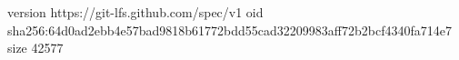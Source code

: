 version https://git-lfs.github.com/spec/v1
oid sha256:64d0ad2ebb4e57bad9818b61772bdd55cad32209983aff72b2bcf4340fa714e7
size 42577
